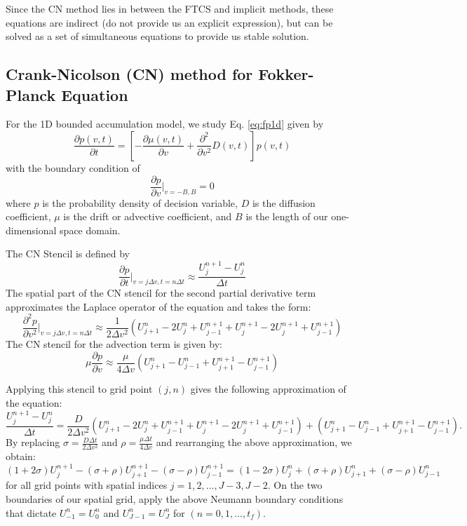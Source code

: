 \documentclass[12pt]{article}		%
\begin{document}
Since the CN method lies in between the FTCS and implicit methods, these equations are indirect (do not provide us an explicit expression), but can be solved as a set of simultaneous equations to provide us stable solution.


\subsection*{Crank-Nicolson (CN) method for Fokker-Planck Equation}
For the 1D bounded accumulation model, we study Eq. \eqref{eq:fp1d} given by 
\[
	\frac{\partial p(v,t)}{\partial t} = \left[- \frac{\partial \mu (v,t)}{\partial v} + \frac{\partial ^2}{\partial v^2} D(v,t) \right] p(v,t)
\]
with the boundary condition of 
\[
	\frac{\partial p}{\partial v} \bigg\rvert _{v = -B, B} = 0
\]
where $p$ is the probability density of decision variable, $D$ is the diffusion coefficient, $\mu$ is the drift or advective coefficient, and $B$ is the length of our one-dimensional space domain.

The CN Stencil is defined by
\[
	\frac{\partial p}{\partial t} \bigg\rvert _{v=j \Delta v, t = n\Delta t} \approx \frac{U_j^{n+1} - U_j^n}{\Delta t}
\]
The spatial part of the CN stencil for the second partial derivative term approximates the Laplace operator of the equation and takes the form:
\[
	\frac{\partial^2 p}{\partial v^2} \bigg\rvert _{v=j \Delta v, t = n\Delta t} \approx \frac{1}{2 \Delta v^2} \left(U_{j+1}^{n} - 2U_j^n + U_{j-1}^{n+1} + U_j^{n+1} - 2 U_j^{n+1}+ U_{j-1}^{n+1} \right)
\]
The CN stencil for the advection term is given by:
\[
	\mu \frac{\partial p}{\partial v} \approx \frac{\mu}{4 \Delta v} \left(U_{j+1}^{n} - U_{j-1}^n + U_{j+1}^{n+1} - U_{j-1}^{n+1} \right)
\]

Applying this stencil to grid point ${(j,n)}$  gives the following approximation of the equation:
\[
	\frac{U_{j}^{n+1} - U_j^{n}}{\Delta t} = \frac{D}{2 \Delta v^2} \left(U_{j+1}^{n} - 2U_j^n + U_{j-1}^{n+1} + U_j^{n+1} - 2 U_j^{n+1}+ U_{j-1}^{n+1} \right) + \left(U_{j+1}^{n} - U_{j-1}^n + U_{j+1}^{n+1} - U_{j-1}^{n+1} \right).
\]
By replacing $\sigma = \frac{D \Delta t}{2 \Delta v^2}$ and $\rho = \frac{\mu \Delta t}{4 \Delta v}$ and rearranging the above approximation, we obtain:
\[
	(1+2 \sigma) U_j^{n+1} - (\sigma + \rho) U_{j+1}^{n+1} - (\sigma - \rho) U_{j-1}^{n+1} = (1-2\sigma) U_j^n + (\sigma + \rho)U_{j+1}^n + (\sigma-\rho) U_{j-1}^n
\]
for all grid points with spatial indices $j = 1, 2, ..., J-3, J -2$. On the two boundaries of our spatial grid, apply the above Neumann boundary conditions that dictate $U_{-1}^n = U_0^n$ and $U_{J-1}^n = U_J^n$ for $(n = 0, 1, ..., t_f)$.\\
\end{document}

